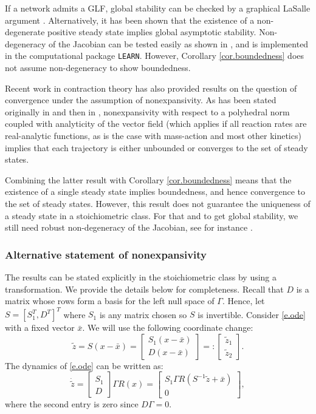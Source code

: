 \documentclass[onefignum,onetabnum]{siamonline220329}
\newcommand\bx{{\bar x}}
\newcommand{\tl}{\tilde}
\begin{document}
{If a network admits a GLF,  global stability can be checked by a graphical LaSalle argument \cite{PWLRj}. Alternatively,	it has been shown \cite{blanchini17} that    the existence of a non-degenerate positive steady state  implies global asymptotic stability. Non-degeneracy of the Jacobian can be tested easily as shown in \cite{blanchini14,MA_LEARN}, and is implemented in the computational package \texttt{LEARN}.  However, Corollary \ref{cor.boundedness} does not assume non-degeneracy to show boundedness. 
 
Recent work in contraction theory \cite{jafarpour21,duvall24} has also provided results on the question of convergence under the assumption of {nonexpansivity}. As has been stated originally in \cite{jafarpour21} and then in \cite[Theorem 2]{duvall24}, nonexpansivity with respect to a polyhe{dr}al norm coupled with analyticity of the vector field (which applies if all reaction rates are real-analytic functions, as is the case with mass-action and most other kinetics) implies that each trajectory is either unbounded or converges to the set of steady states. 

 

Combining the latter result with Corollary \ref{cor.boundedness} means that the existence of a single steady state implies bound{ed}ness, and hence convergence to the set of steady states.  However, this result does not guarantee the uniqueness of a steady state in a stoichiometric class. For that and to get global stability, we still need robust non-degeneracy of the Jacobian, see for instance \cite[Theorem 19,iii]{jafarpour21}.
 
 

 
 \subsubsection{Alternative statement of nonexpansivity}
 The results can be stated explicitly in the stoichiometric class by using a transformation. We provide the details below for completeness.  Recall that $D$ is a matrix whose rows form a basis for the left null space of $\Gamma$. Hence, let  $S=[S_1^T,D^T]^T$ where $S_1$ is any matrix chosen so $S$ is invertible.  Consider \eqref{e.ode} with a fixed vector $\bx$. We will use the following coordinate change:   \[ \tl z= S(x-\bx)=\begin{bmatrix} S_1 (x-\bx) \\ D(x-\bx) \end{bmatrix}=:\begin{bmatrix}\tl z_1 \\ \tl z_2 \end{bmatrix}. \] 
 The dynamics of \eqref{e.ode} can be written as:
 \[\dot{\tl z}= \begin{bmatrix} S_1 \\ D \end{bmatrix} 
 \Gamma R(x)= \begin{bmatrix} S_1  \Gamma R(S^{-1} \tl z+\bx) \\ 0 \end{bmatrix}, \]
 where the second entry is zero since $D\Gamma=0$. 
 
}
\end{document}

